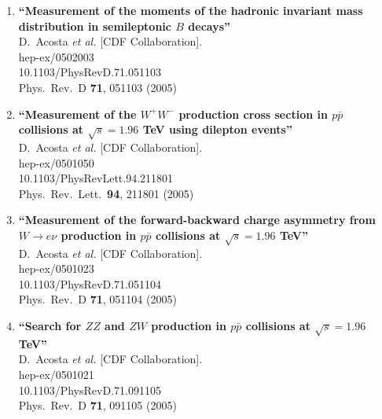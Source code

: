 \documentclass{article}
\begin{document}
\begin{enumerate}
\item%
{\bf ``Measurement of the moments of the hadronic invariant mass distribution in semileptonic $B$ decays''}
  \\{}D.~Acosta {\it et al.}  [CDF Collaboration].
  \\{}hep-ex/0502003
    \\{}10.1103/PhysRevD.71.051103
\\{}Phys.\ Rev.\ D {\bf 71}, 051103 (2005) %


\item%
{\bf ``Measurement of the $W^+ W^-$ production cross section in $p\bar{p}$ collisions at $\sqrt{s} = 1.96$ TeV using dilepton events''}
  \\{}D.~Acosta {\it et al.}  [CDF Collaboration].
  \\{}hep-ex/0501050
    \\{}10.1103/PhysRevLett.94.211801
\\{}Phys.\ Rev.\ Lett.\  {\bf 94}, 211801 (2005) %


\item%
{\bf ``Measurement of the forward-backward charge asymmetry from $W \to e \nu$ production in $p\bar{p}$ collisions at $\sqrt{s} = 1.96$ TeV''}
  \\{}D.~Acosta {\it et al.}  [CDF Collaboration].
  \\{}hep-ex/0501023
    \\{}10.1103/PhysRevD.71.051104
\\{}Phys.\ Rev.\ D {\bf 71}, 051104 (2005) %


\item%
{\bf ``Search for $Z Z$ and $Z W$ production in $p\bar{p}$ collisions at $\sqrt{s} = 1.96$ TeV''}
  \\{}D.~Acosta {\it et al.}  [CDF Collaboration].
  \\{}hep-ex/0501021
    \\{}10.1103/PhysRevD.71.091105
\\{}Phys.\ Rev.\ D {\bf 71}, 091105 (2005) %



\end{enumerate}
\end{document}
